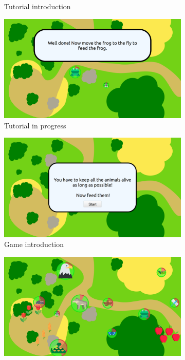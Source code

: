\begin{figure}[ht]
\begin{subfigure}[b]{0.325\textwidth}
		\caption{Tutorial introduction}
		\label{fig:tuto_tuto_intro}
	\end{subfigure}
	\centering
	\begin{subfigure}[b]{0.325\textwidth}
		\centering
		\includegraphics[width=\textwidth]{game_sequence/tutorial.png}
		\caption{Tutorial in progress}
		\label{fig:tuto_tuto}
	\end{subfigure}	
	\begin{subfigure}[b]{0.325\textwidth}
		\centering
		\includegraphics[width=\textwidth]{game_sequence/introgame.png}
		\caption{Game introduction}
		\label{fig:tuto_game_intro}
	\end{subfigure}
	\centering
	\begin{subfigure}[b]{0.325\textwidth}
		\centering
		\includegraphics[width=\textwidth]{game_sequence/game1.png}

\end{subfigure}
\end{figure}
